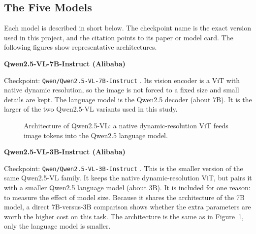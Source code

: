 \documentclass[a4paper,12pt]{report}
\newcommand{\minisection}[1]{%
  \vspace{1ex}
  \noindent\textbf{#1}\par
  \vspace{0.5ex}
}
\begin{document}
\subsection{The Five Models}

Each model is described in short below. The checkpoint name is the exact version used in this project, and the citation points to its paper or model card. The following figures show representative architectures.

\minisection{Qwen2.5-VL-7B-Instruct (Alibaba)}

Checkpoint: \texttt{Qwen/Qwen2.5-VL-7B-Instruct} \cite{qwen25vl2025}. Its vision encoder is a ViT with native dynamic resolution, so the image is not forced to a fixed size and small details are kept. The language model is the Qwen2.5 decoder (about 7B). It is the larger of the two Qwen2.5-VL variants used in this study.

\begin{figure}[H]
    \centering
    \caption{Architecture of Qwen2.5-VL: a native dynamic-resolution ViT feeds image tokens into the Qwen2.5 language model.}
    \label{fig:qwen-arch}
\end{figure}

\minisection{Qwen2.5-VL-3B-Instruct (Alibaba)}

Checkpoint: \texttt{Qwen/Qwen2.5-VL-3B-Instruct} \cite{qwen25vl2025}. This is the smaller version of the same Qwen2.5-VL family. It keeps the native dynamic-resolution ViT, but pairs it with a smaller Qwen2.5 language model (about 3B). It is included for one reason: to measure the effect of model size. Because it shares the architecture of the 7B model, a direct 7B-versus-3B comparison shows whether the extra parameters are worth the higher cost on this task. The architecture is the same as in Figure~\ref{fig:qwen-arch}, only the language model is smaller.
\end{document}
